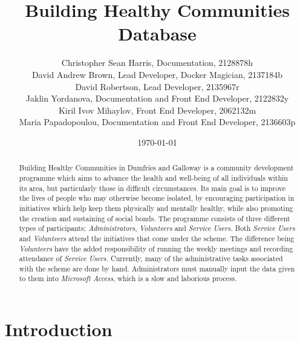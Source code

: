 \documentclass{l3proj}
\begin{document}
\title{Building Healthy Communities Database}

\author{
Christopher Sean Harris, Documentation, 2128878h \\
David Andrew Brown, Lead Developer, Docker Magician, 2137184b \\
David Robertson, Lead Developer, 2135967r \\
Jaklin Yordanova, Documentation and Front End Developer, 2122832y \\
Kiril Ivov Mihaylov, Front End Developer, 2062132m \\
Maria Papadopoulou, Documentation and Front End Developer, 2136603p}

\date{\today}

\maketitle

\begin{abstract}

Building Healthy Communities in Dumfries and Galloway is a community development programme which aims to advance the health and well-being of all individuals within its area, but particularly those in difficult circumstances. Its main goal is to improve the lives of people who may otherwise become isolated, by encouraging participation in initiatives which help keep them physically and mentally healthy, while also promoting the creation and sustaining of social bonds. The programme consists of three different types of participants; \textit{Administrators}, \textit{Volunteers} and \textit{Service Users.} Both \textit{Service Users} and \textit{Volunteers} attend the initiatives that come under the scheme. The difference being \textit{Volunteers} have the added responsibility of running the weekly meetings and recording attendance of \textit{Service Users.} Currently, many of the administrative tasks associated with the scheme are done by hand. Administrators must manually input the data given to them into \textit{Microsoft Access}, which is a slow and laborious process.

\end{abstract}

\educationalconsent
\section{Introduction}
\end{document}
